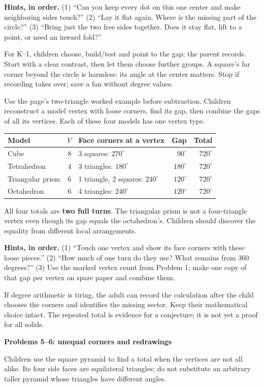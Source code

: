 \documentclass[11pt,letterpaper]{article}
\newcommand{\titleline}[1]{\par{\Large\bfseries #1}\par\vspace{4pt}}
\newcommand{\sub}[1]{\par\vspace{3pt}{\bfseries #1}\par}
\newcommand{\hints}[3]{\textbf{Hints, in order.} (1) #1 (2) #2 (3) #3\par}
\newcommand{\degc}{^{\circ}}
\begin{document}
\hints{``Can you keep every dot on this one center and make neighboring sides touch?''}{``Lay it flat again. Where is the missing part of the circle?''}{``Bring just the two free sides together. Does it stay flat, lift to a point, or need an inward fold?''}
For K--1, children choose, build/test and point to the gap; the parent records. Start with a clear contrast, then let them choose further groups. A square's far corner beyond the circle is harmless: its angle at the center matters. Stop if recording takes over; save a fan without degree values.

\sub{Problem 4 / student p.4 / arithmetic continuation}
Use the page's two-triangle worked example before subtraction. Children reconstruct a model vertex with loose corners, find its gap, then combine the gaps of all its vertices. Each of these four models has one vertex type.

\begin{center}
\begin{tabular}{|l|r|l|r|r|}\hline
Model & $V$ & Face corners at a vertex & Gap & Total\\\hline
Cube & 8 & 3 squares: $270\degc$ & $90\degc$ & $720\degc$\\
Tetrahedron & 4 & 3 triangles: $180\degc$ & $180\degc$ & $720\degc$\\
Triangular prism & 6 & 1 triangle, 2 squares: $240\degc$ & $120\degc$ & $720\degc$\\
Octahedron & 6 & 4 triangles: $240\degc$ & $120\degc$ & $720\degc$\\\hline
\end{tabular}
\end{center}
All four totals are \textbf{two full turns}. The triangular prism is not a four-triangle vertex even though its gap equals the octahedron's. Children should discover the equality from different local arrangements.

\hints{``Touch one vertex and show its face corners with these loose pieces.''}{``How much of one turn do they use? What remains from 360 degrees?''}{Use the marked vertex count from Problem 1; make one copy of that gap per vertex on spare paper and combine them.}
If degree arithmetic is tiring, the adult can record the calculation after the child chooses the corners and identifies the missing sector. Keep their mathematical choice intact. The repeated total is evidence for a conjecture; it is not yet a proof for all solids.

\newpage
\titleline{Problems 5--6: unequal corners and redrawings}
\sub{Problem 5 / student p.5 / further concrete work}
Children use the square pyramid to find a total when the vertices are not all alike. Its four side faces are equilateral triangles; do not substitute an arbitrary taller pyramid whose triangles have different angles.
\end{document}

